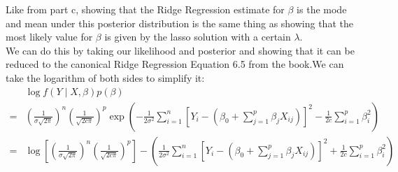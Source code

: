 \documentclass[10pt]{article}
\begin{document}
Like from part c, showing that the Ridge Regression estimate for $\beta$ is the mode and mean under this posterior distribution is the same thing as showing that the most likely value for $\beta$ is given by the lasso solution with a certain $\lambda$.\\
\qquad We can do this by taking our likelihood and posterior and showing that it can be reduced to the canonical Ridge Regression Equation 6.5 from the book.We can take the logarithm of both sides to simplify it:
\begin{align*}
    &\log f(Y \mid X, \beta)p(\beta)\\
   =&
    \left(
        \frac{
            1
        }{
            \sigma \sqrt{2\pi}
        }
    \right)^n
    \left(
        \frac{
            1
        }{
            \sqrt{
                2c\pi
            }
        }
    \right)^p
    \exp
    \left(
        - \frac{
            1
        }{
            2\sigma^2
        }
        \sum_{i = 1}^{n}
        \left[
            Y_i - (\beta_0 + \sum_{j = 1}^{p} \beta_j X_{ij})
        \right]^2
        - \frac{
            1
        }{
            2c
        }
        \sum_{i = 1}^{p} \beta_i^2
    \right)
    \\
    =&
    \log
    \left[
        \left(
            \frac{
                1
            }{
                \sigma \sqrt{2\pi}
            }
        \right)^n
        \left(
            \frac{
                1
            }{
                \sqrt{
                    2c\pi
                }
            }
        \right)^p
    \right]
    -
    \left(
        \frac{
            1
        }{
            2\sigma^2
        }
        \sum_{i = 1}^{n}
        \left[
            Y_i - (\beta_0 + \sum_{j = 1}^{p} \beta_j X_{ij})
        \right]^2
        +
        \frac{
            1
        }{
            2c
        }
        \sum_{i = 1}^{p} \beta_i^2
    \right)
\end{align*}
\end{document}

